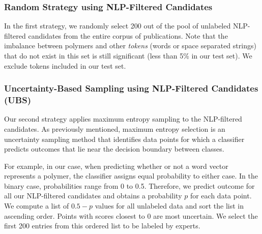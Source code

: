 \subsubsection{Random Strategy using NLP-Filtered Candidates}
In the first strategy, we randomly select 200 out of the pool of unlabeled NLP-filtered candidates from the entire corpus of publications.
Note that the imbalance between polymers and other \textit{tokens} (words or space separated strings) that 
do not exist in this set is still significant (less than 5\% in our test set).
We exclude tokens included in our test set.

\subsubsection{Uncertainty-Based Sampling using NLP-Filtered Candidates (UBS)}
Our second strategy applies maximum entropy sampling to the NLP-filtered candidates. %
As previously mentioned, maximum entropy selection is an uncertainty sampling method that
identifies data points for which a classifier predicts outcomes that lie near the decision boundary 
between classes. 


For example, in our case, when predicting whether or not a word vector represents a polymer, 
the classifier assigns equal probability to either case.
In the binary case, probabilities range from 0 to 0.5. 
Therefore, we predict outcome for all our NLP-filtered candidates and obtains a probability $p$ for each data point. We compute a list of $0.5-p$ values for all unlabeled data and sort the list in ascending order.
Points with scores closest to $0$ are most uncertain.
We select the first 200 entries from this ordered list to be labeled by experts.

